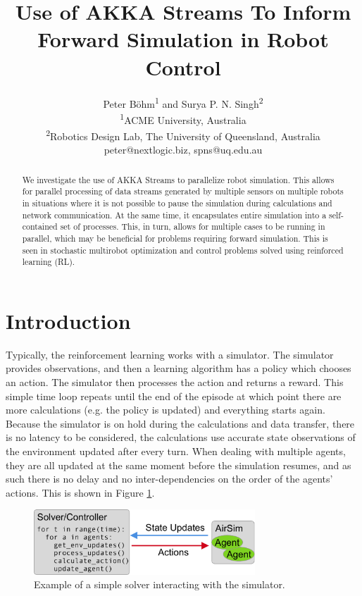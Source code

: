 \documentclass{article}
\title{Use of AKKA Streams To Inform Forward Simulation in Robot Control}
\author{Peter Böhm\textsuperscript{1} and Surya P. N. Singh\textsuperscript{2}\\ \textsuperscript{1}ACME University, Australia\\ 
	\textsuperscript{2}Robotics Design Lab, The University of Queensland, Australia\\
	peter@nextlogic.biz, spns@uq.edu.au}
\begin{document}
\maketitle

\begin{abstract}
We investigate the use of AKKA Streams to parallelize robot simulation. This allows for parallel processing of data streams generated by multiple sensors on multiple robots in situations where it is not possible to pause the simulation during calculations and network communication. At the same time, it encapsulates entire simulation into a self-contained set of processes. This, in turn, allows for multiple cases to be running in parallel, which may be beneficial for problems requiring forward simulation. This is seen in stochastic multirobot optimization and control problems solved using reinforced learning (RL).

\end{abstract}

\section{Introduction}
Typically, the reinforcement learning works with a simulator. The simulator provides observations, and then a learning algorithm has a policy which chooses an action. The simulator then processes the action and returns a reward. This simple time loop repeats until the end of the episode at which point there are more calculations (e.g. the policy is updated) and everything starts again. Because the simulator is on hold during the calculations and data transfer, there is no latency to be considered, the calculations use accurate state observations of the environment updated after every turn. When dealing with multiple agents, they are all updated at the same moment before the simulation resumes, and as such there is no delay and no inter-dependencies on the order of the agents' actions. This is shown in Figure \ref{fig:naive-solver}.
\begin{figure}
	\centering
	\includegraphics[width=8.31cm]{naive-solver}
	\caption{Example of a simple solver interacting with the simulator.}\label{fig:naive-solver}
\end{figure}
\end{document}

